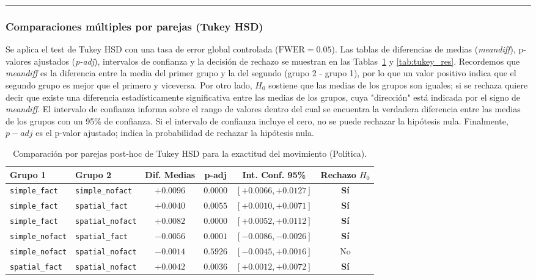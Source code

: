 \documentclass[12pt, a4paper]{article}
\begin{document}
\rule{\textwidth}{0.2pt}
\subsubsection{Comparaciones múltiples por parejas (Tukey HSD)}
Se aplica el test de Tukey HSD con una tasa de error global controlada ($\text{FWER} = 0.05$). Las tablas de diferencias de medias (\textit{meandiff}), p-valores ajustados (\textit{p-adj}), intervalos de confianza y la decisión de rechazo se muestran en las Tablas~\ref{tab:tukey_mov} y \ref{tab:tukey_res}. Recordemos que \textit{meandiff} es la diferencia entre la media del primer grupo y la del segundo (grupo 2 - grupo 1), por lo que un valor positivo indica que el segundo grupo es mejor que el primero y viceversa. Por otro lado, $H_0$ sostiene que las medias de los grupos son iguales; si se rechaza quiere decir que existe una diferencia estadísticamente significativa entre las medias de los grupos, cuya "dirección" está indicada por el signo de \textit{meandiff}. El intervalo de confianza informa sobre el rango de valores dentro del cual se encuentra la verdadera diferencia entre las medias de los grupos con un 95\% de confianza. Si el intervalo de confianza incluye el cero, no se puede rechazar la hipótesis nula. Finalmente, $p-adj$ es el p-valor ajustado; indica la probabilidad de rechazar la hipótesis nula.

\begin{table}[htbp]
    \centering
    \small
    \begin{tabular}{|l|l|c|c|c|c|}
    \hline
    \textbf{Grupo 1} & \textbf{Grupo 2} & \textbf{Dif. Medias} & \textbf{p-adj} & \textbf{Int. Conf. 95\%} & \textbf{Rechazo $H_0$} \\
    \hline
    \texttt{simple\_fact} & \texttt{simple\_nofact} & $+0.0096$ & $0.0000$ & $[+0.0066, +0.0127]$ & \textbf{Sí} \\
    \texttt{simple\_fact} & \texttt{spatial\_fact} & $+0.0040$ & $0.0055$ & $[+0.0010, +0.0071]$ & \textbf{Sí} \\
    \texttt{simple\_fact} & \texttt{spatial\_nofact} & $+0.0082$ & $0.0000$ & $[+0.0052, +0.0112]$ & \textbf{Sí} \\
    \texttt{simple\_nofact} & \texttt{spatial\_fact} & $-0.0056$ & $0.0001$ & $[-0.0086, -0.0026]$ & \textbf{Sí} \\
    \texttt{simple\_nofact} & \texttt{spatial\_nofact} & $-0.0014$ & $0.5926$ & $[-0.0045, +0.0016]$ & No \\
    \texttt{spatial\_fact} & \texttt{spatial\_nofact} & $+0.0042$ & $0.0036$ & $[+0.0012, +0.0072]$ & \textbf{Sí} \\
    \hline
    \end{tabular}
    \caption[Comparación estadística usando Tukey HSD para la política]{Comparación por parejas post-hoc de Tukey HSD para la exactitud del movimiento (Política).}
    \label{tab:tukey_mov}
\end{table}
\end{document}
